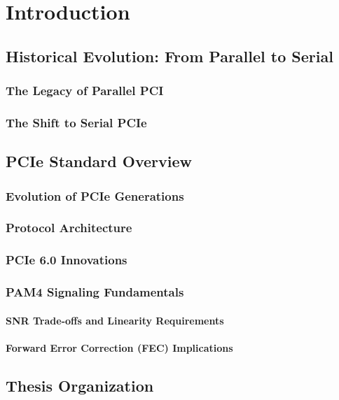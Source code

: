
\chapter{Introduction}
    \section{Historical Evolution: From Parallel to Serial}
        \subsection{The Legacy of Parallel PCI}
        \subsection{The Shift to Serial PCIe}
    \section{PCIe Standard Overview}
        \subsection{Evolution of PCIe Generations}
        \subsection{Protocol Architecture}
        \subsection{PCIe 6.0 Innovations}
        \subsection{PAM4 Signaling Fundamentals}
            \subsubsection{SNR Trade-offs and Linearity Requirements}
            \subsubsection{Forward Error Correction (FEC) Implications}
    \section{Thesis Organization}

